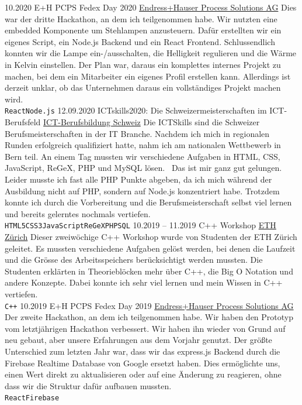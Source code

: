 \documentclass[9pt]{developercv} %
\begin{document}
\begin{entrylist}
	\entry
		{10.2020}
		{E+H PCPS Fedex Day 2020}
		{\href{https://endress.com}{Endress+Hauser Process Solutions AG}}
		{Dies war der dritte Hackathon, an dem ich teilgenommen habe. Wir nutzten eine embedded Komponente um Stehlampen anzusteuern. Dafür erstellten wir ein eigenes Script, ein Node.js Backend und ein React Frontend. Schlussendlich konnten wir die Lampe ein-/ausschalten, die Helligkeit regulieren und die Wärme in Kelvin einstellen. Der Plan war, daraus ein komplettes internes Projekt zu machen, bei dem ein Mitarbeiter ein eigenes Profil erstellen kann. Allerdings ist derzeit unklar, ob das Unternehmen daraus ein vollständiges Projekt machen wird.\\ \texttt{React}\slashsep\texttt{Node.js}}
	\entry
		{12.09.2020}
		{ICTskills2020: Die Schweizermeisterschaften im ICT-Berufsfeld}
		{\href{https://www.ict-berufsbildung.ch/}{ICT-Berufsbildung Schweiz}}
		{Die ICTSkills sind die Schweizer Berufsmeisterschaften in der IT Branche. Nachdem ich mich in regionalen Runden erfolgreich qualifiziert hatte, nahm ich am nationalen Wettbewerb in Bern teil.
    An einem Tag mussten wir verschiedene Aufgaben in HTML, CSS, JavaScript, ReGeX, PHP und MySQL lösen.  Das ist mir ganz gut gelungen. Leider musste ich fast alle PHP Punkte abgeben, da ich mich während der Ausbildung nicht auf PHP, sondern auf Node.js konzentriert habe.
    Trotzdem konnte ich durch die Vorbereitung und die Berufsmeisterschaft selbst viel lernen und bereits gelerntes nochmals vertiefen.\\ \texttt{HTML5}\slashsep\texttt{CSS3}\slashsep\texttt{JavaScript}\slashsep\texttt{ReGeX}\slashsep\texttt{PHP}\slashsep\texttt{SQL}}
	\entry
		{10.2019 -- 11.2019}
		{C++ Workshop}
		{\href{https://ethz.ch/}{ETH Zürich}}
		{Dieser zweiwöchige C++ Workshop wurde von Studenten der ETH Zürich geleitet. Es mussten verschiedene Aufgaben gelöst werden, bei denen die Laufzeit und die Grösse des Arbeitsspeichers berücksichtigt werden mussten. Die Studenten erklärten in Theorieblöcken mehr über C++, die Big O Notation und andere Konzepte. Dabei konnte ich sehr viel lernen und mein Wissen in C++ vertiefen.\\ \texttt{C++}}
	\entry
		{10.2019}
		{E+H PCPS Fedex Day 2019}
		{\href{https://endress.com}{Endress+Hauser Process Solutions AG}}
		{Der zweite Hackathon, an dem ich teilgenommen habe. Wir haben den Prototyp vom letztjährigen Hackathon verbessert. Wir haben ihn wieder von Grund auf neu gebaut, aber unsere Erfahrungen aus dem Vorjahr genutzt. Der größte Unterschied zum letzten Jahr war, dass wir das express.js Backend durch die Firebase Realtime Database von Google ersetzt haben. Dies ermöglichte uns, einen Wert direkt zu aktualisieren oder auf eine Änderung zu reagieren, ohne dass wir die Struktur dafür aufbauen mussten.\\ \texttt{React}\slashsep\texttt{Firebase}}

\end{entrylist}
\end{document}
